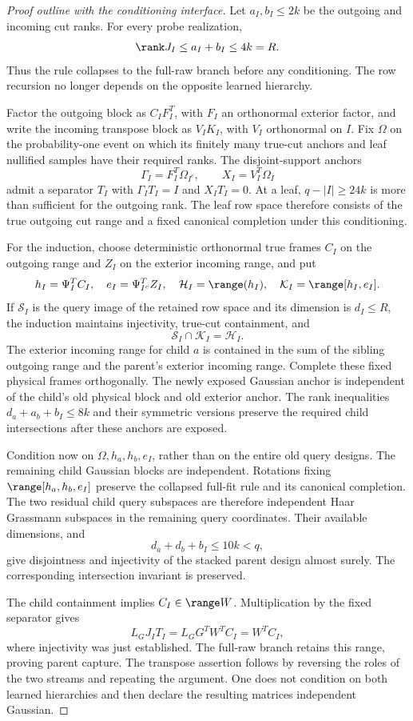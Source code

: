 \documentclass[11pt,oneside,openany,a4paper]{book}
\numberwithin{equation}{chapter}
\theoremstyle{definition}
\theoremstyle{remark}
\begin{document}
\begin{proof}[Proof outline with the conditioning interface]
Let $a_I,b_I\leq2k$ be the outgoing and incoming cut ranks.  For every
probe realization,
\[
 \rank J_I\leq a_I+b_I\leq4k=R.
\]
Thus the rule collapses to the full-raw branch before any conditioning.
The row recursion no longer depends on the opposite learned hierarchy.

Factor the outgoing block as $C_IF_I^T$, with $F_I$ an orthonormal
exterior factor, and write the incoming transpose block as $V_IK_I$,
with $V_I$ orthonormal on $I$.  Fix $\Omega$ on the probability-one
event on which its finitely many true-cut anchors and leaf nullified
samples have their required ranks.  The disjoint-support anchors
\[
 \Gamma_I=F_I^T\Omega_{I^c},\qquad X_I=V_I^T\Omega_I
\]
admit a separator $T_I$ with $\Gamma_IT_I=I$ and $X_IT_I=0$.
At a leaf, $q-|I|\geq24k$ is more than sufficient for the outgoing
rank.  The leaf row space therefore consists of the true outgoing cut
range and a fixed canonical completion under this conditioning.

For the induction, choose deterministic orthonormal true frames $C_I$
on the outgoing range and $Z_I$ on the exterior incoming range, and put
\[
 h_I=\Psi_I^TC_I,\quad e_I=\Psi_{I^c}^TZ_I,
 \quad \mathcal H_I=\range(h_I),\quad
 \mathcal K_I=\range[h_I,e_I].
\]
If $\mathcal S_I$ is the query image of the retained row space and its
dimension is $d_I\leq R$, the induction maintains injectivity,
true-cut containment, and
\[
 \mathcal S_I\cap\mathcal K_I=\mathcal H_I.
\]
The exterior incoming range for child $a$ is contained in the sum of
the sibling outgoing range and the parent's exterior incoming range.
Complete these fixed physical frames orthogonally.  The newly exposed
Gaussian anchor is independent of the child's old physical block and
old exterior anchor.  The rank inequalities
$d_a+a_b+b_I\leq8k$ and their symmetric versions preserve the required
child intersections after these anchors are exposed.

Condition now on $\Omega,h_a,h_b,e_I$, rather than on the entire old
query designs.  The remaining child Gaussian blocks are independent.
Rotations fixing $\range[h_a,h_b,e_I]$ preserve the collapsed full-fit
rule and its canonical completion.  The two residual child query
subspaces are therefore independent Haar Grassmann subspaces in the
remaining query coordinates.  Their available dimensions, and
\[
 d_a+d_b+b_I\leq10k<q,
\]
give disjointness and injectivity of the stacked parent design almost
surely.  The corresponding intersection invariant is preserved.

The child containment implies $C_I\in\range W$.  Multiplication by the
fixed separator gives
\[
 L_GJ_IT_I=L_GG^TW^TC_I=W^TC_I,
\]
where injectivity was just established.  The full-raw branch retains
this range, proving parent capture.  The transpose assertion follows
by reversing the roles of the two streams and repeating the argument.
One does not condition on both learned hierarchies and then declare
the resulting matrices independent Gaussian.
\end{proof}
\end{document}
